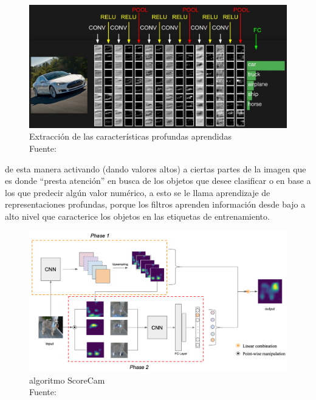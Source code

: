 	    \begin{figure}[H]
 	        \centering
			\includegraphics[scale=0.25]{imagenes/convnet}
 		    \caption[Extracción de las características profundas aprendidas]{Extracción de las características profundas aprendidas\\ Fuente: \citep{stanford_2020}}
	    \end{figure}

	    
	    \noindent de esta manera activando (dando valores altos) a ciertas partes de la imagen que es donde ``presta atención'' en busca de los objetos que desee clasificar o en base a los que predecir algún valor numérico, a esto se le llama aprendizaje de representaciones profundas, porque los filtros aprenden información desde bajo a alto nivel que caracterice los objetos en las etiquetas de entrenamiento.
		
		\begin{figure}[H]
			\centering
			\includegraphics[scale=0.25]{imagenes/scorecam_net}
			\caption[Algoritmo ScoreCam]{algoritmo ScoreCam\\Fuente:\citep{Wang_2020_CVPR_Workshops}}\label{scorecam}
		\end{figure} 
		
